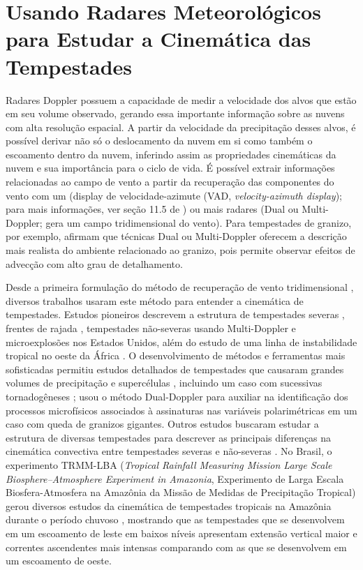 \section{Usando Radares Meteorológicos para Estudar a Cinemática das Tempestades}

Radares Doppler possuem a capacidade de medir a velocidade dos alvos que estão em seu volume observado, gerando essa importante informação sobre as nuvens com alta resolução espacial. A partir da velocidade da precipitação desses alvos, é possível derivar não só o deslocamento da nuvem em si como também o escoamento dentro da nuvem, inferindo assim as propriedades cinemáticas da nuvem e sua importância para o ciclo de vida. É possível extrair informações relacionadas ao campo de vento a partir da recuperação das componentes do vento com um  (display de velocidade-azimute (VAD, \textit{velocity-azimuth display}); para mais informações, ver seção 11.5 de ) ou mais radares (Dual ou Multi-Doppler; gera um campo tridimensional do vento). Para tempestades de granizo, por exemplo,  afirmam que técnicas Dual ou Multi-Doppler oferecem a descrição mais realista do ambiente relacionado ao granizo, pois permite observar efeitos de advecção com alto grau de detalhamento.

Desde a primeira formulação do método de recuperação de vento tridimensional \cite{Armijo1969}, diversos trabalhos usaram este método para entender a cinemática de tempestades. Estudos pioneiros descrevem a estrutura de tempestades severas \cite{Brandes1977, Ray1980}, frentes de rajada \cite{Weaver1982}, tempestades não-severas usando Multi-Doppler \cite{Ray1978} e microexplosões \cite{Wilson1984} nos Estados Unidos, além do estudo de uma linha de instabilidade tropical no oeste da África \cite{Chong1987}. O desenvolvimento de métodos e ferramentas mais sofisticadas permitiu estudos detalhados de tempestades que causaram grandes volumes de precipitação \cite{Petersen1999a, Calhoun2013} e supercélulas \cite{Potvin2012a, Potvin2012b}, incluindo um caso com sucessivas tornadogêneses \cite{Wurman2007};  usou o método Dual-Doppler para auxiliar na identificação dos processos microfísicos associados à assinaturas nas variáveis polarimétricas em um caso com queda de granizos gigantes. Outros estudos buscaram estudar a estrutura de diversas tempestades para descrever as principais diferenças na cinemática convectiva entre tempestades severas e não-severas \cite{Lang2002, Deierling2008}. No Brasil, o experimento TRMM-LBA (\textit{Tropical Rainfall Measuring Mission Large Scale Biosphere–Atmosphere Experiment in Amazonia}, Experimento de Larga Escala Biosfera-Atmosfera na Amazônia da Missão de Medidas de Precipitação Tropical) gerou diversos estudos da cinemática de tempestades tropicais na Amazônia durante o período chuvoso \cite{Rutledge2000, Cifelli2002b, Cifelli2004a}, mostrando que as tempestades que se desenvolvem em um escoamento de leste em baixos níveis apresentam extensão vertical maior e correntes ascendentes mais intensas comparando com as que se desenvolvem em um escoamento de oeste.

